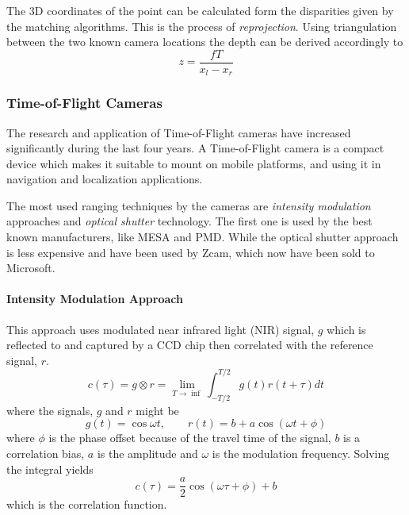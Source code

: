 The 3D coordinates of the point can be calculated form the disparities given by the
matching algorithms. This is the process of \emph{reprojection}. Using triangulation
between the two known camera locations the depth can be derived accordingly to 
\begin{equation}
    z = \frac{f T}{x_l - x_r}
\end{equation}

\subsubsection{Time-of-Flight Cameras}
The research and application of Time-of-Flight cameras have increased significantly during the last four
years. A Time-of-Flight camera is a compact device which makes it suitable to mount on
mobile platforms, and using it in navigation and localization applications. 

The most used ranging techniques by the cameras are \emph{intensity modulation} approaches and
\emph{optical shutter} technology. The first one is used by the best known manufacturers,
like MESA and PMD. While the optical shutter approach is less expensive and have been used
by Zcam, which now have been sold to Microsoft. 


\paragraph{Intensity Modulation Approach}
\label{chap2:subsec-tof}
This approach uses modulated near infrared light (NIR) signal, $g$ which is reflected to and
captured by a CCD chip then correlated with the reference signal, $r$. 
\begin{equation}
    c(\tau) = g \otimes r = \lim_{T \rightarrow \inf} \int^{T/2}_{-T/2} g(t) r(t + \tau) dt
\end{equation}
where the signals, $g$ and $r$ might be
\begin{equation}
    g(t) = \cos{\omega t}, \quad \quad r(t) = b + a \cos{(\omega t + \phi)}
\end{equation}
where $\phi$ is the phase offset because of the travel time of the signal, $b$ is a
correlation bias, $a$ is the amplitude and $\omega$ is the modulation frequency. Solving
the integral yields 
\begin{equation}
    c(\tau) = \frac{a}{2} \cos{(\omega \tau + \phi )} + b
\end{equation}
which is the correlation function. 

